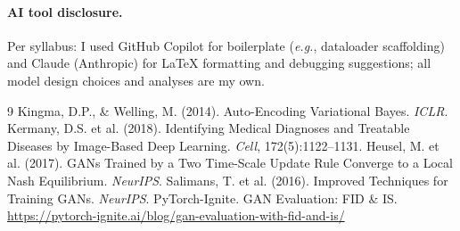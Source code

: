 \documentclass{article}
\begin{document}
\paragraph{AI tool disclosure.} Per syllabus: I used GitHub Copilot for boilerplate
(\textit{e.g.}, dataloader scaffolding) and Claude (Anthropic) for LaTeX formatting and
debugging suggestions; all model design choices and analyses are my own.


\begin{thebibliography}{9}
 Kingma, D.P., \& Welling, M. (2014). Auto-Encoding Variational Bayes. \textit{ICLR}.
 Kermany, D.S. et al. (2018). Identifying Medical Diagnoses and Treatable Diseases by Image-Based Deep Learning. \textit{Cell}, 172(5):1122--1131.
 Heusel, M. et al. (2017). GANs Trained by a Two Time-Scale Update Rule Converge to a Local Nash Equilibrium. \textit{NeurIPS}.
 Salimans, T. et al. (2016). Improved Techniques for Training GANs. \textit{NeurIPS}.
 PyTorch-Ignite. GAN Evaluation: FID \& IS. \url{https://pytorch-ignite.ai/blog/gan-evaluation-with-fid-and-is/}
\end{thebibliography}
\end{document}
